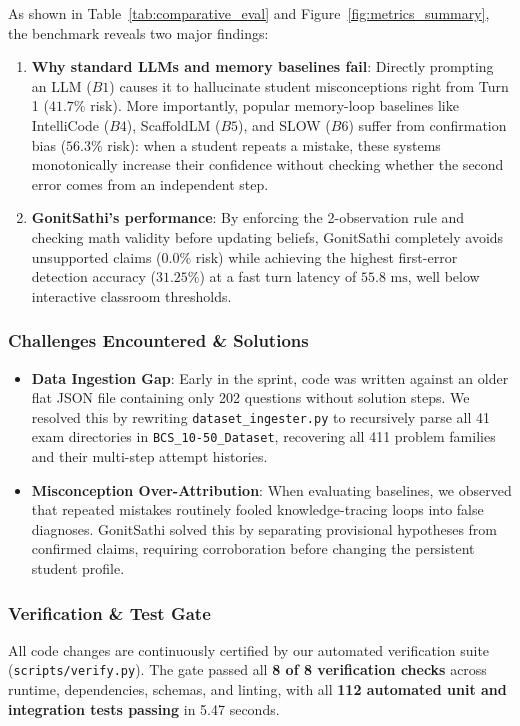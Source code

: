 \documentclass[lettersize,onecolumn,journal]{IEEEtran}
\begin{document}
As shown in Table~\ref{tab:comparative_eval} and Figure~\ref{fig:metrics_summary}, the benchmark reveals two major findings:
\begin{enumerate}
    \item \textbf{Why standard LLMs and memory baselines fail}: Directly prompting an LLM ($B1$) causes it to hallucinate student misconceptions right from Turn 1 ($41.7\%$ risk). More importantly, popular memory-loop baselines like IntelliCode ($B4$), ScaffoldLM ($B5$), and SLOW ($B6$) suffer from confirmation bias ($56.3\%$ risk): when a student repeats a mistake, these systems monotonically increase their confidence without checking whether the second error comes from an independent step.
    \item \textbf{GonitSathi's performance}: By enforcing the 2-observation rule and checking math validity before updating beliefs, GonitSathi completely avoids unsupported claims ($0.0\%$ risk) while achieving the highest first-error detection accuracy ($31.25\%$) at a fast turn latency of $55.8\text{ ms}$, well below interactive classroom thresholds.
\end{enumerate}

\subsubsection{Challenges Encountered \& Solutions}
\begin{itemize}
    \item \textbf{Data Ingestion Gap}: Early in the sprint, code was written against an older flat JSON file containing only 202 questions without solution steps. We resolved this by rewriting \texttt{dataset\_ingester.py} to recursively parse all 41 exam directories in \texttt{BCS\_10-50\_Dataset}, recovering all 411 problem families and their multi-step attempt histories.
    \item \textbf{Misconception Over-Attribution}: When evaluating baselines, we observed that repeated mistakes routinely fooled knowledge-tracing loops into false diagnoses. GonitSathi solved this by separating provisional hypotheses from confirmed claims, requiring corroboration before changing the persistent student profile.
\end{itemize}

\subsubsection{Verification \& Test Gate}
All code changes are continuously certified by our automated verification suite (\texttt{scripts/verify.py}). The gate passed all \textbf{8 of 8 verification checks} across runtime, dependencies, schemas, and linting, with all \textbf{112 automated unit and integration tests passing} in 5.47 seconds.
\end{document}
